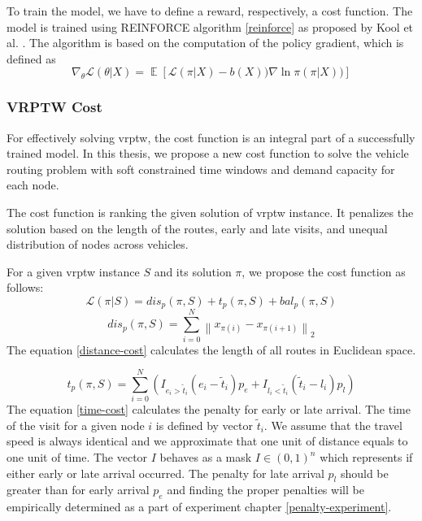     To train the model, we have to define a reward, respectively, a cost function. The model is trained using REINFORCE algorithm \ref{reinforce} as proposed by Kool et al. \cite{attention-route}. The algorithm is based on the computation of the policy gradient, which is defined as
    \begin{equation}\label{encoder-attention-score}
        \nabla_{\theta} \mathcal{L}(\theta|X) = \mathop{\mathbb{E}}[ \mathcal{L}(\pi|X) - b(X)) \nabla \ln \pi (\pi|X))]
    \end{equation}
    
        \subsubsection{VRPTW Cost}\label{vrptw-rl}
        For effectively solving \gls{vrptw}, the cost function is an integral part of a successfully trained model. In this thesis, we propose a new cost function to solve the vehicle routing problem with soft constrained time windows and demand capacity for each node.
        
        The cost function is ranking the given solution of \gls{vrptw} instance. It penalizes the solution based on the length of the routes, early and late visits, and unequal distribution of nodes across vehicles.
        
        For a given \gls{vrptw} instance $S$ and its solution $\pi$, we propose the cost function as follows:
        \newcommand{\norm}[1]{\left\lVert#1\right\rVert}
        \begin{equation}\label{vrptw-cost}
            \mathcal{L}(\pi|S) = dis_p(\pi, S) + t_p(\pi, S) + bal_p(\pi, S)
        \end{equation}
        \begin{equation}\label{distance-cost}
            dis_p(\pi, S) = \sum_{i=0}^N \norm{x_{\pi(i)} - x_{\pi(i+1)}}_2
        \end{equation}
        The equation \ref{distance-cost} calculates the length of all routes in Euclidean space.
        
        \begin{equation}\label{time-cost}
            t_p(\pi, S) = \sum_{i=0}^N (I_{e_i > \widetilde{t}_i} (e_i - \widetilde{t}_i) p_e + I_{l_i < \widetilde{t}_i} (\widetilde{t}_i - l_i) p_l)
        \end{equation}
        The equation \ref{time-cost} calculates the penalty for early or late arrival. The time of the visit for a given node $i$ is defined by vector $\widetilde{t}_i$. We assume that the travel speed is always identical and we approximate that one unit of distance equals to one unit of time. The vector $I$ behaves as a mask $I \in (0, 1)^n$ which represents if either early or late arrival occurred. The penalty for late arrival $p_l$ should be greater than for early arrival $p_e$ and finding the proper penalties will be empirically determined as a part of experiment chapter \ref{penalty-experiment}.
        
